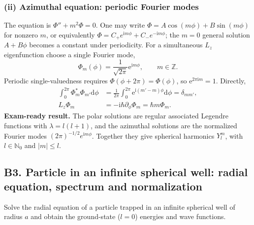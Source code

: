 \documentclass[11pt,a4paper]{article}
\newcommand{\dd}{\mathrm{d}}
\newcommand{\iu}{\mathrm{i}}
\newcommand{\ee}{\mathrm{e}}
\begin{document}
\subsubsection*{(ii) Azimuthal equation: periodic Fourier modes}
The equation is \(\Phi''+m^2\Phi=0\). One may write \(\Phi=A\cos(m\phi)+B\sin(m\phi)\) for nonzero \(m\), or equivalently \(\Phi=C_+e^{\iu m\phi}+C_-e^{-\iu m\phi}\); the \(m=0\) general solution \(A+B\phi\) becomes a constant under periodicity. For a simultaneous \(L_z\) eigenfunction choose a single Fourier mode,
\begin{equation}\boxed{\Phi_m(\phi)=\frac{1}{\sqrt{2\pi}}\ee^{\iu m\phi},\qquad m\in\mathbb Z.}\end{equation}
Periodic single-valuedness requires \(\Phi(\phi+2\pi)=\Phi(\phi)\), so \(\ee^{2\pi\iu m}=1\). Directly,
\begin{align}
\int_0^{2\pi}\Phi_m^*\Phi_{m'}\dd\phi&=\frac1{2\pi}\int_0^{2\pi}\ee^{\iu(m'-m)\phi}\dd\phi=\delta_{mm'},\\
L_z\Phi_m&=-\iu\hbar\partial_\phi\Phi_m=\hbar m\Phi_m.
\end{align}
\textbf{Exam-ready result.} The polar solutions are regular associated Legendre functions with \(\lambda=l(l+1)\), and the azimuthal solutions are the normalized Fourier modes \((2\pi)^{-1/2}e^{\iu m\phi}\). Together they give spherical harmonics \(Y_l^m\), with \(l\in\mathbb N_0\) and \(|m|\le l\).

\subsection{B3. Particle in an infinite spherical well: radial equation, spectrum and normalization}
\begin{questionbox}Solve the radial equation of a particle trapped in an infinite spherical well of radius \(a\) and obtain the ground-state (\(l=0\)) energies and wave functions.\end{questionbox}
\end{document}
